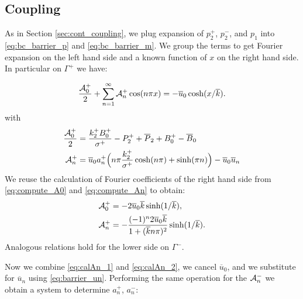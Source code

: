 \documentclass{elsarticle}
\def\ol#1{\overline{#1}}
\begin{document}
\subsection{Coupling}

As in Section \ref{sec:cont_coupling}, we plug expansion of $p_2^+$, $p_2^-$, and $p_1$ into \eqref{eq:bc_barrier_p} and \eqref{eq:bc_barrier_m}. 
We group the terms to get Fourier expansion on the left hand side and a known function of $x$ on the right hand side.
In particular on  $\Gamma^+$ we have:
% 

\begin{equation}
    \frac{{\cal A}_0^+}{2} + \sum^{\infty}_{n=1} {\cal A}_n^+ \cos (n\pi x) =  - \ol{u}_0 \cosh(x/ \ol{k}).
\end{equation}
with
\begin{align}
    \label{eq:calA0_1}
    \frac{{\cal A}_0^+}{2} &= \frac{k_2^+ B_0^+}{\sigma^+} - P_2^+ + \ol{P}_2 + B_0^+ - \ol{B}_0\\
    \label{eq:calAn_1}
    {\cal A}_n^+          &=  \ol{u}_0 a_n^+ \Big( n \pi \frac{k_2^+ }{\sigma^+}  \cosh(n \pi) 
        +     \sinh(\pi n)  \Big) 
        - \ol{u}_0 \ol{u}_n   
\end{align}
We reuse the calculation of Fourier coefficients of the right hand side from \eqref{eq:compute_A0} and \eqref{eq:compute_An} to obtain:
\begin{align}
    \label{eq:calA0_2}
    {\cal A}_0^+ &= - 2 \ol{u}_0 \ol{k}\sinh( 1/\ol{k} ), \\
    \label{eq:calAn_2}
    {\cal A}_n^+ &=  - \frac{(-1)^n  2 \ol{u}_0 \ol{k}}{1+(\ol{k} n \pi)^2}\sinh(1/\ol{k}).
\end{align}
Analogous relations hold for the lower side on $\Gamma^-$.

Now we combine \eqref{eq:calAn_1} and \eqref{eq:calAn_2}, we cancel $\ol{u}_0$, and we substitute for $\ol{u}_n$ using \eqref{eq:barrier_un}.
Performing the same operation for the ${\cal A}_n^-$  we obtain a system to determine $a_n^+$, $a_n^-$:
\end{document}
